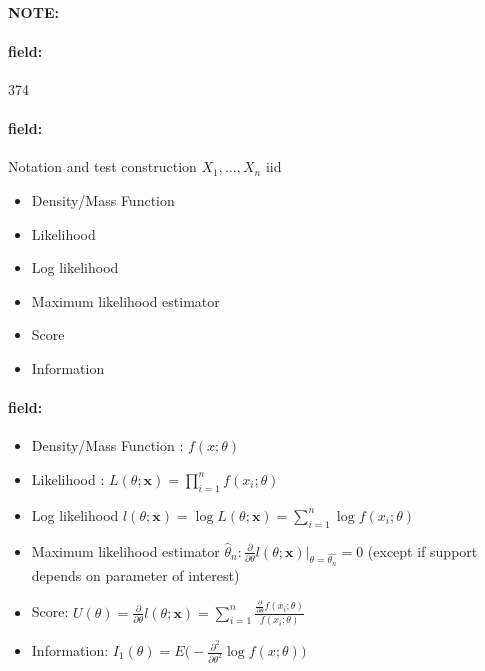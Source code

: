 \documentclass[12pt]{article}
\newenvironment{note}{\paragraph{NOTE:}}{}
\newenvironment{field}{\paragraph{field:}}{}
\begin{document}
\begin{note}
    \begin{field}
        \tiny 374
    \end{field}
    \begin{field}
        Notation and test construction $X_1, \ldots, X_n$ iid
        \begin{itemize}
          \item Density/Mass Function
          \item Likelihood
          \item Log likelihood
          \item Maximum likelihood estimator
          \item Score
          \item Information
        \end{itemize}
    \end{field}
    \begin{field}
      \begin{itemize}
        \item Density/Mass Function : $f(x;\theta)$
        \item Likelihood : $L(\theta;\mathbf{x}) = \prod_{i=1}^n f(x_i;\theta)$
        \item Log likelihood $l(\theta;\mathbf{x}) = \log L(\theta;\mathbf{x}) = \sum_{i=1}^n \log f(x_i;\theta)$
        \item Maximum likelihood estimator $\hat{\theta}_n : \frac{\partial}{\partial \theta} l(\theta;\mathbf{x})\bigg|_{\theta = \hat{\theta_n}} = 0$ (except if support depends on parameter of interest)
        \item Score: $U(\theta) = \frac{\partial}{\partial \theta} l(\theta;\mathbf{x}) = \sum_{i=1}^n \frac{\frac{\partial}{\partial \theta}f(x_i;\theta)}{f(x_i;\theta)} $
        \item Information: $I_1(\theta) = E\bigg(- \frac{\partial^2}{\partial \theta^2} \log f(x; \theta)\bigg)$
      \end{itemize}
    \end{field}
\end{note}
\end{document}
